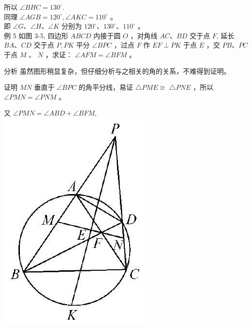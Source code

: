 \documentclass[10pt]{article}
\begin{document}
所以 $\angle B H C=130^{\circ}$.\\
同理 $\angle A G B=120^{\circ}, \angle A K C=110^{\circ}$ 。\\
即 $\angle G 、 \angle H 、 \angle K$ 分别为 $120^{\circ} 、 130^{\circ} 、 110^{\circ}$ 。\\
例 5 如图 3-5, 四边形 $A B C D$ 内接于圆 $O$ ，对角线 $A C 、 B D$ 交于点 $F$, 延长 $B A 、 C D$ 交于点 $P, P K$ 平分 $\angle B P C$ ，过点 $F$ 作 $E F \perp P K$ 于点 $E$ ，交 $P B 、 P C$ 于点 $M$ 、 $N$ ，求证： $\angle A F M=\angle B F M$ 。

分析 虽然图形稍显复杂，但仔细分析与之相关的角的关系，不难得到证明。

证明 $M N$ 垂直于 $\angle B P C$ 的角平分线，易证 $\triangle P M E \cong$ $\triangle P N E$ ，所以 $\angle P M N=\angle P N M$ 。

又 $\angle P M N=\angle A B D+\angle B F M$,\\
\includegraphics[max width=\textwidth, center]{2024_10_30_66b8e5e701da2093c133g-024(1)}
\end{document}
